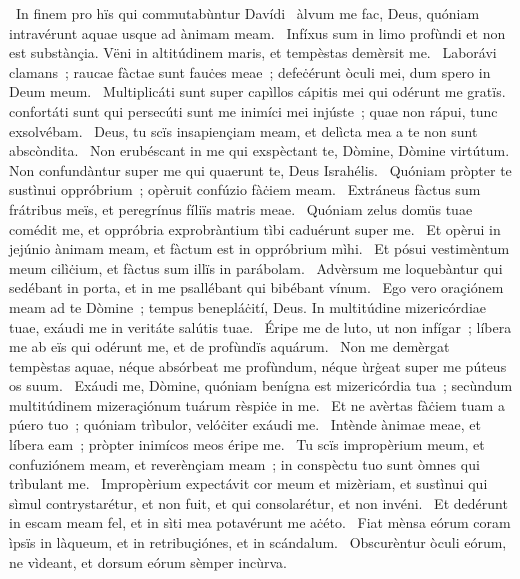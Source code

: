 {~In finem pro hïs qui commutabùntur Davídi}
{%
~àlvum me fac, Deus, quóniam intravérunt aquae usque ad ànimam meam.
~Infíxus sum in limo profùndi et non est substànçia. Vëni in altitúdinem maris, et tempèstas demèrsit me.
~Laborávi clamans~; raucae fàctae sunt fauċes meae~; defeċérunt òculi mei, dum spero in Deum meum.
~Multiplicáti sunt super capìllos cápitis mei qui odérunt me gratïs. confortáti sunt qui persecúti sunt me inimíci mei injúste~; quae non rápui, tunc exsolvébam.
~Deus, tu scïs insapiençiam meam, et delìcta mea a te non sunt abscòndita.
~Non erubéscant in me qui exspèctant te, Dòmine, Dòmine virtútum. Non confundàntur super me qui quaerunt te, Deus Israhélis.
~Quóniam pròpter te sustìnui oppróbrium~; opèruit confúzio fàċiem meam.
~Extráneus fàctus sum frátribus meïs, et peregrínus fíliïs matris meae.
~Quóniam zelus domüs tuae comédit me, et oppróbria exprobràntium tìbi caduérunt super me.
~Et opèrui in jejúnio ànimam meam, et fàctum est in oppróbrium mìhi.
~Et pósui vestimèntum meum cilìċium, et fàctus sum illïs in parábolam.
~Advèrsum me loquebàntur qui sedébant in porta, et in me psallébant qui bibébant vínum.
~Ego vero oraçiónem meam ad te Dòmine~; tempus benepláċití, Deus. In multitúdine mizericórdiae tuae, exáudi me in veritáte salútis tuae.
~Éripe me de luto, ut non infígar~; líbera me ab eïs qui odérunt me, et de profùndïs aquárum.
~Non me demèrgat tempèstas aquae, néque absórbeat me profùndum, néque ùrġeat super me púteus os suum.
~Exáudi me, Dòmine, quóniam benígna est mizericórdia tua~; secùndum multitúdinem mizeraçiónum tuárum rèspiċe in me.
~Et ne avèrtas fàċiem tuam a púero tuo~; quóniam trìbulor, velóċiter exáudi me.
~Intènde ànimae meae, et líbera eam~; pròpter inimícos meos éripe me.
~Tu scïs impropèrium meum, et confuziónem meam, et reverènçiam meam~; in conspèctu tuo sunt òmnes qui trìbulant me.
~Impropèrium expectávit cor meum et mizèriam, et sustìnui qui sìmul contrystarétur, et non fuit, et qui consolarétur, et non invéni.
~Et dedérunt in escam meam fel, et in sìti mea potavérunt me aċéto.
~Fiat mènsa eórum coram ìpsïs in làqueum, et in retribuçiónes, et in scándalum.
~Obscurèntur òculi eórum, ne vìdeant, et dorsum eórum sèmper incùrva.
}
